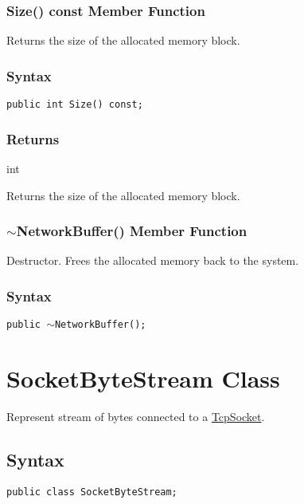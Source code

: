 \documentclass[a4paper,oneside,11.000000pt]{book}
\begin{document}
\hypertarget{System.Net.Sockets.NetworkBuffer.Size.C.P.System.Net.Sockets.NetworkBuffer}{\subsubsection*{Size() const Member Function}}
\begin{flushleft}
Returns the size of the allocated memory block.

\end{flushleft}
\subsubsection*{Syntax}\texttt{public int Size() const;}

\subsubsection*{Returns}int
\begin{flushleft}
Returns the size of the allocated memory block.

\end{flushleft}
\clearpage

\hypertarget{System.Net.Sockets.NetworkBuffer.destructor.P.System.Net.Sockets.NetworkBuffer}{\subsubsection*{$\sim$NetworkBuffer() Member Function}}
\begin{flushleft}
Destructor. Frees the allocated memory back to the system.

\end{flushleft}
\subsubsection*{Syntax}\texttt{public $\sim$NetworkBuffer();}
\clearpage

\hypertarget{System.Net.Sockets.SocketByteStream}{\section{SocketByteStream Class}}
\begin{flushleft}
Represent stream of bytes connected to a \hyperlink{System.Net.Sockets.TcpSocket}{TcpSocket}.

\end{flushleft}
\subsection*{Syntax}\texttt{public class SocketByteStream;}
\end{document}
